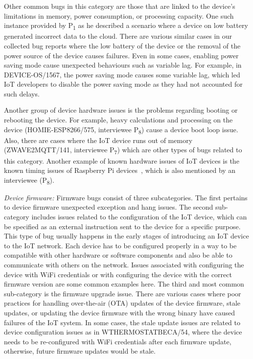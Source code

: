  Other common bugs in this category are those that are linked to the device's limitations in memory, power consumption, or processing capacity. One such instance provided by P\textsubscript{1} as he described a scenario where a device on low battery generated incorrect data to the cloud. There are various similar cases in our collected bug reports where the low battery of the device or the removal of the power source of the device causes failures. Even in some cases, enabling power saving mode cause unexpected behaviours such as variable lag. For example, in DEVICE-OS/1567, the power saving mode causes some variable lag, which led IoT developers to disable the power saving mode as they had not accounted for such delays.
 
 Another group of device hardware issues is the problems regarding booting or rebooting the device. For example, heavy calculations and processing on the device (HOMIE-ESP8266/575, interviewee P\textsubscript{8}) cause a device boot loop issue. Also, there are cases where the IoT device runs out of memory (ZWAVE2MQTT/141, interviewee P\textsubscript{7}) which are other types of bugs related to this category. Another example of known hardware issues of IoT devices is the known timing issues of Raspberry Pi devices~\cite{piClockissues},  which is also mentioned by an interviewee (P\textsubscript{8}).

\textit{Device firmware:} 
Firmware bugs consist of three subcategories. The first pertains to device firmware unexpected exception and hang issues. The second sub-category includes issues related to the configuration of the IoT device, which can be specified as an external instruction sent to the device for a specific purpose. This type of bug usually happens in the early stages of introducing an IoT device to the IoT network. Each device has to be configured properly in a way to be compatible with other hardware or software components and also be able to communicate with others on the network. Issues associated with configuring the device with WiFi credentials or with configuring the device with the correct firmware version are some common examples here. The third and most common sub-category is the firmware upgrade issue. There are various cases where poor practices for handling over-the-air (OTA) updates of the device firmware, stale updates, or updating the device firmware with the wrong binary have caused failures of the IoT system.
In some cases, the stale update issues are related to device configuration issues as in WTHERMOSTATBECA/54, where the device needs to be re-configured with WiFi credentials after each firmware update, otherwise, future firmware updates would be stale. 

